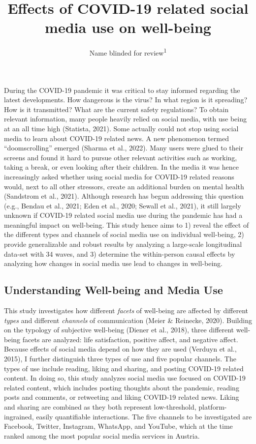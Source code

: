 \documentclass[
  man,mask,floatsintext]{apa7}
\title{Effects of COVID-19 related social media use on well-being}
\author{Name blinded for review\textsuperscript{1}}
\date{}
\affiliation{\vspace{0.5cm}\textsuperscript{1} }
\begin{document}
\maketitle

During the COVID-19 pandemic it was critical to stay informed regarding the latest developments.
How dangerous is the virus?
In what region is it spreading?
How is it transmitted? What are the current safety regulations?
To obtain relevant information, many people heavily relied on social media, with use being at an all time high (Statista, 2021).
Some actually could not stop using social media to learn about COVID-19 related news.
A new phenomenon termed ``doomscrolling'' emerged (Sharma et al., 2022).
Many users were glued to their screens and found it hard to pursue other relevant activities such as working, taking a break, or even looking after their children.
In the media it was hence increasingly asked whether using social media for COVID-19 related reasons would, next to all other stressors, create an additional burden on mental health (Sandstrom et al., 2021).
Although research has begun addressing this question
(e.g., Bendau et al., 2021; Eden et al., 2020; Sewall et al., 2021),
it still largely unknown if COVID-19 related social media use during the pandemic has had a meaningful impact on well-being.
This study hence aims to 1) reveal the effect of the different types and channels of social media use on individual well-being, 2) provide generalizable and robust results by analyzing a large-scale longitudinal data-set with 34 waves, and 3) determine the within-person causal effects by analyzing how changes in social media use lead to changes in well-being.

\hypertarget{understanding-well-being-and-media-use}{%
\subsection{Understanding Well-being and Media Use}\label{understanding-well-being-and-media-use}}

This study investigates how different \emph{facets} of well-being are affected by different \emph{types} and different \emph{channels} of communication (Meier \& Reinecke, 2020).
Building on the typology of subjective well-being (Diener et al., 2018), three different well-being facets are analyzed: life satisfaction, positive affect, and negative affect.
Because effects of social media depend on how they are used (Verduyn et al., 2015), I further distinguish three types of use and five popular channels.
The types of use include reading, liking and sharing, and posting COVID-19 related content.
In doing so, this study analyzes social media use focused on COVID-19 related content, which includes posting thoughts about the pandemic, reading posts and comments, or retweeting and liking COVID-19 related news.
Liking and sharing are combined as they both represent low-threshold, platform-ingrained, easily quantifiable interactions.
The five channels to be investigated are Facebook, Twitter, Instagram, WhatsApp, and YouTube, which at the time ranked among the most popular social media services in Austria.
\end{document}
